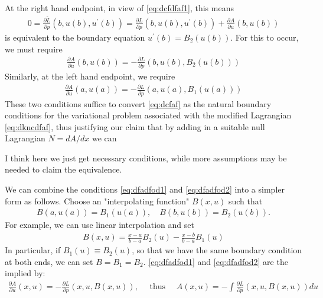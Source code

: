\documentclass{article}
\begin{document}
At the right hand endpoint, in view of \cref{eq:dcfdfaf1}, this means
\begin{align*}
0=\frac{\partial \widetilde{L}}{\partial p}\left(b, u(b), u^{\prime}(b)\right)=\frac{\partial L}{\partial p}\left(b, u(b), u^{\prime}(b)\right)+\frac{\partial A}{\partial u}(b, u(b))
\end{align*}
is equivalent to the boundary equation $u^{\prime}(b)=B_{2}(u(b))$. For this to occur, we must require
\begin{align}
\frac{\partial A}{\partial u}(b, u(b))=-\frac{\partial L}{\partial p}\left(b, u(b), B_{2}(u(b))\right)\label{eq:dfadfod1}
\end{align}
Similarly, at the left hand endpoint, we require
\begin{align}
\frac{\partial A}{\partial u}(a, u(a))=-\frac{\partial L}{\partial p}\left(a, u(a), B_{1}(u(a))\right)\label{eq:dfadfod2}
\end{align}
These two conditions suffice to convert \cref{eq:dcfaf} as the natural boundary conditions for the variational problem associated with the modified Lagrangian \cref{eq:dkncdfaf}, thus justifying our claim that by adding in a suitable null Lagrangian $N=d A / d x$ we can 
\begin{rema}
I think here we just get necessary conditions, while more assumptions may be needed to claim the equivalence.
\end{rema}

We can combine the conditions \cref{eq:dfadfod1} and \cref{eq:dfadfod2} into a simpler form as follows. Choose an "interpolating function" $B(x, u)$ such that
\begin{align*}
B(a, u(a))=B_{1}(u(a)), \quad B(b, u(b))=B_{2}(u(b)) .
\end{align*}
For example, we can use linear interpolation and set
\begin{align}
B(x, u)=\frac{x-a}{b-a} B_{2}(u)-\frac{x-b}{b-a} B_{1}(u)\label{eq:onmdfadfa}
\end{align}
In particular, if $B_{1}(u) \equiv B_{2}(u)$, so that we have the same boundary condition at both ends, we can set $B= B_1=B_2$.  \cref{eq:dfadfod1} and \cref{eq:dfadfod2}  are the implied by:
\begin{align}
    \frac{\partial A}{\partial u}(x, u)=-\frac{\partial L}{\partial p}(x, u, B(x, u)), \quad\text{ thus }\quad A(x, u)=-\int \frac{\partial L}{\partial p}(x, u, B(x, u)) d u\label{eq:domcdfa}
\end{align}
\end{document}
